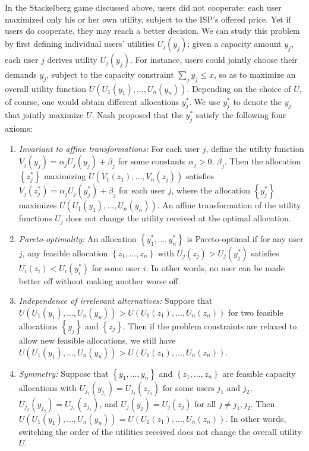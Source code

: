 In the Stackelberg game discussed above, users did not cooperate: each user maximized only his or her own utility, subject to the ISP's offered price. Yet if users do cooperate, they may reach a better decision. We can study this problem by first defining individual users' utilities $U_j(y_j)$; given a capacity amount $y_j$, each user $j$ derives utility $U_j(y_j)$. For instance, users could jointly choose their demands $y_j$, subject to the capacity constraint $\sum_j y_j \leq x$, so as to maximize an overall utility function $U\left(U_1(y_1),\ldots,U_n(y_n)\right)$. Depending on the choice of $U$, of course, one would obtain different allocations $y_j^\ast$. We use $y_j^\ast$ to denote the $y_j$ that jointly maximize $U$. Nash proposed that the $y_j^\ast$ satisfy the following four axioms:
\begin{enumerate}
\item
\emph{Invariant to affine transformations:} For each user $j$, define the utility function $V_j(y_j) = \alpha_j U_j(y_j) + \beta_j$ for some constants $\alpha_j > 0$, $\beta_j$. Then the allocation $\left\{z_j^\ast\right\}$ maximizing $U\left(V_1(z_1),\ldots,V_n(z_j)\right)$ satisfies $V_j\left(z_j^\ast\right) = \alpha_jU_j\left(y_j^\ast\right) + \beta_j$ for each user $j$, where the allocation $\left\{y_j^\ast\right\}$ maximizes $U\left(U_1(y_1),\ldots,U_n(y_n)\right)$. An affine transformation of the utility functions $U_j$ does not change the utility received at the optimal allocation.
\item
\emph{Pareto-optimality:} An allocation $\left\{y_1^\ast,\ldots,y_n^\ast\right\}$ is Pareto-optimal if for any user $j$, any feasible allocation $\left\{z_1,\ldots,z_n\right\}$ with $U_j(z_j) > U_j\left(y_j^\ast\right)$ satisfies $U_i(z_i) < U_i\left(y_i^\ast\right)$ for some user $i$. In other words, no user can be made better off without making another worse off.
\item
\emph{Independence of irrelevant alternatives:} Suppose that $U\left(U_1(y_1),\ldots,U_n(y_n)\right) > U\left(U_1(z_1),\ldots,U_n(z_n)\right)$ for two feasible allocations $\left\{y_j\right\}$ and $\left\{z_j\right\}$. Then if the problem constraints are relaxed to allow new feasible allocations, we still have $U\left(U_1(y_1),\ldots,U_n(y_n)\right) > U\left(U_1(z_1),\ldots,U_n(z_n)\right)$.
\item
\emph{Symmetry:} Suppose that $\left\{y_1,\ldots,y_n\right\}$ and $\left\{z_1,\ldots,z_n\right\}$ are feasible capacity allocations with $U_{j_1}(y_{j_1}) = U_{j_2}(z_{j_2})$ for some users $j_1$ and $j_2$, $U_{j_2}(y_{j_2}) = U_{j_1}(z_{j_1})$, and $U_j(y_j) = U_j(z_j)$ for all $j\neq j_1, j_2$. Then $U\left(U_1(y_1),\ldots,U_n(y_n)\right) = U\left(U_1(z_1),\ldots,U_n(z_n)\right)$. In other words, switching the order of the utilities received does not change the overall utility $U$.
\end{enumerate}
